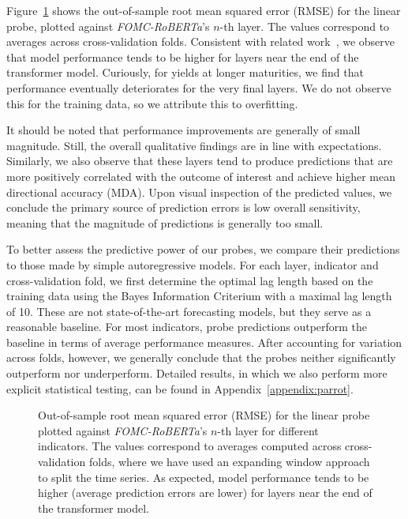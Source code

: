 Figure~\ref{fig-fomc} shows the out-of-sample root mean squared error (RMSE) for the linear probe, plotted against \emph{FOMC-RoBERTa}'s \(n\)-th layer. The values correspond to averages across cross-validation folds. Consistent with related work~\citep{alain2018understanding,gurnee2023languagev2}, we observe that model performance tends to be higher for layers near the end of the transformer model. Curiously, for yields at longer maturities, we find that performance eventually deteriorates for the very final layers. We do not observe this for the training data, so we attribute this to overfitting. 

It should be noted that performance improvements are generally of small magnitude. Still, the overall qualitative findings are in line with expectations. Similarly, we also observe that these layers tend to produce predictions that are more positively correlated with the outcome of interest and achieve higher mean directional accuracy (MDA). Upon visual inspection of the predicted values, we conclude the primary source of prediction errors is low overall sensitivity, meaning that the magnitude of predictions is generally too small. 

To better assess the predictive power of our probes, we compare their predictions to those made by simple autoregressive models. For each layer, indicator and cross-validation fold, we first determine the optimal lag length based on the training data using the Bayes Information Criterium with a maximal lag length of 10. These are not state-of-the-art forecasting models, but they serve as a reasonable baseline. For most indicators, probe predictions outperform the baseline in terms of average performance measures. After accounting for variation across folds, however, we generally conclude that the probes neither significantly outperform nor underperform. Detailed results, in which we also perform more explicit statistical testing, can be found in Appendix~\ref{appendix:parrot}.

\begin{figure}


\caption{\label{fig-fomc}Out-of-sample root mean squared error (RMSE) for the linear probe plotted against \emph{FOMC-RoBERTa}'s \(n\)-th layer for different indicators. The values correspond to averages computed across cross-validation folds, where we have used an expanding window approach to split the time series. As expected, model performance tends to be higher (average prediction errors are lower) for layers near the end of the transformer model.}

\end{figure}%

